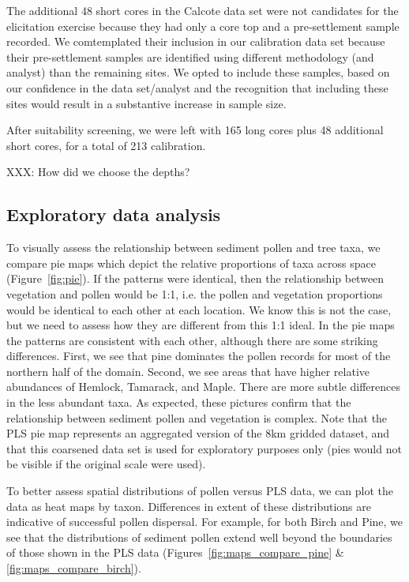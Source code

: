 \documentclass[12pt]{article}
\begin{document}
The additional 48 short cores in the Calcote data set were not candidates for
the elicitation exercise because they had only a core top and a
pre-settlement sample recorded. We comtemplated their inclusion in our
calibration data set because their pre-settlement samples are
identified using different methodology (and analyst) than the
remaining sites. We opted to include these samples, based on our
confidence in the data set/analyst and the recognition that including
these sites would result in a substantive increase in sample size.

After suitability screening, we were left with 165 long cores plus 48
additional short cores, for a total of 213 calibration.

XXX: How did we choose the depths?

\subsection{Exploratory data analysis}

To visually assess the relationship between sediment pollen and tree
taxa, we compare pie maps which depict the relative proportions of
taxa across space (Figure~\ref{fig:pie}). If the patterns were
identical, then the relationship between vegetation and pollen would
be 1:1, i.e. the pollen and vegetation proportions would be identical
to each other at each location. We know this is not the case, but we
need to assess how they are different from this 1:1 ideal. In the pie
maps the patterns are consistent with each other, although there are
some striking differences. First, we see that pine dominates the
pollen records for most of the northern half of the domain. Second, we
see areas that have higher relative abundances of Hemlock, Tamarack,
and Maple. There are more subtle differences in the less abundant
taxa. As expected, these pictures confirm that the relationship
between sediment pollen and vegetation is complex. Note that the PLS
pie map represents an aggregated version of the 8km gridded dataset,
and that this coarsened data set is used for exploratory purposes only
(pies would not be visible if the original scale were used).

To better assess spatial distributions of pollen versus PLS data, we
can plot the data as heat maps by taxon. Differences in extent of these
distributions are indicative of successful pollen dispersal. For
example, for both Birch and Pine, we see that the distributions of
sediment pollen extend well beyond the boundaries of those shown in the PLS
data (Figures~\ref{fig:maps_compare_pine} \& \ref{fig:maps_compare_birch}). 
\end{document}
